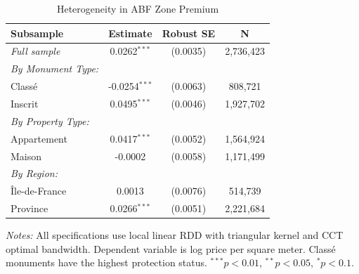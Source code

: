 \begin{table}[t]
\centering
\caption{Heterogeneity in ABF Zone Premium}
\label{tab:heterogeneity}
\begin{tabular}{lccc}
\toprule
Subsample & Estimate & Robust SE & N \\
\midrule
\textit{Full sample} & 0.0262$^{***}$ & (0.0035) & 2,736,423 \\
\midrule
\textit{By Monument Type:} & & & \\
\quad Class\'{e} & -0.0254$^{***}$ & (0.0063) & 808,721 \\
\quad Inscrit & 0.0495$^{***}$ & (0.0046) & 1,927,702 \\
\midrule
\textit{By Property Type:} & & & \\
\quad Appartement & 0.0417$^{***}$ & (0.0052) & 1,564,924 \\
\quad Maison & -0.0002 & (0.0058) & 1,171,499 \\
\midrule
\textit{By Region:} & & & \\
\quad \^Ile-de-France & 0.0013 & (0.0076) & 514,739 \\
\quad Province & 0.0266$^{***}$ & (0.0051) & 2,221,684 \\
\bottomrule
\end{tabular}
\begin{tablenotes}
\item \textit{Notes:} All specifications use local linear RDD with triangular kernel and CCT optimal bandwidth. Dependent variable is log price per square meter. Class\'{e} monuments have the highest protection status. $^{***}p<0.01$, $^{**}p<0.05$, $^{*}p<0.1$.
\end{tablenotes}
\end{table}
